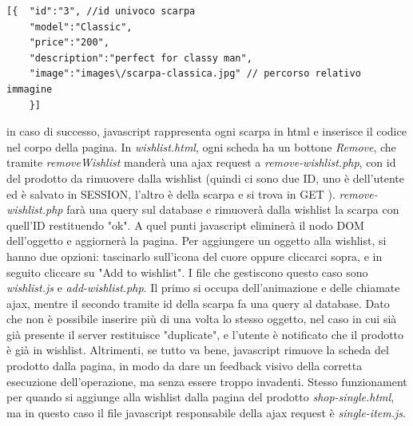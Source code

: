 \documentclass[a4paper,12pt]{article}
\begin{document}
\begin{lstlisting}
[{	"id":"3", //id univoco scarpa
	"model":"Classic",
	"price":"200",
	"description":"perfect for classy man",
	"image":"images\/scarpa-classica.jpg" // percorso relativo immagine
	}]
\end{lstlisting}
in caso di successo, javascript rappresenta ogni scarpa in html e inserisce il codice
nel corpo della pagina.
In \textit{wishlist.html}, ogni scheda ha un bottone \textit{Remove},
che tramite  \textit{removeWishlist} manderà una ajax request a \textit{remove-wishlist.php},
con id del prodotto da rimuovere dalla wishlist (quindi ci sono due ID, uno è dell'utente
ed è salvato in \textdollar\textunderscore SESSION, l'altro è della scarpa e si trova in \textdollar\textunderscore GET ).
\textit{remove-wishlist.php} farà una query sul database e rimuoverà dalla wishlist la scarpa con
quell'ID restituendo "ok". A quel punti javascript eliminerà il nodo DOM dell'oggetto
e aggiornerà la pagina.
Per aggiungere un oggetto alla wishlist, si hanno due opzioni: tascinarlo sull'icona del cuore
oppure cliccarci sopra, e in seguito cliccare su "Add to wishlist".
I file che gestiscono questo caso sono \textit{wishlist.js} e \textit{add-wishlist.php}.
Il primo si occupa dell'animazione e delle chiamate ajax, mentre il secondo tramite id della scarpa
fa una query al database. Dato che non è possibile inserire più di una volta lo stesso
oggetto, nel caso in cui sià già presente il server restituisce "duplicate", e l'utente è
notificato che il prodotto è già in wishlist. Altrimenti, se tutto va bene, javascript
rimuove la scheda del prodotto dalla pagina, in modo da dare un feedback visivo
della corretta esecuzione dell'operazione, ma senza essere troppo invadenti.
Stesso funzionament per quando si aggiunge alla wishlist dalla pagina del prodotto
\textit{shop-single.html}, ma in questo caso il file javascript responsabile della ajax request è
\textit{single-item.js}.
\end{document}
